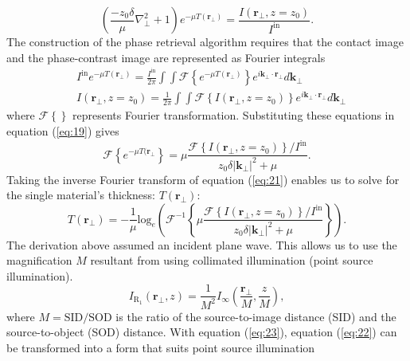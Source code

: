\documentclass[10pt, a4paper, singlespacing]{report}
\begin{document}
 \begin{equation}\label{eq:19}
\left (\frac{- z_0 \delta}{\mu}\nabla^{2}_{\perp} + 1 \right )e^{-\mu T(\mathbf{r}_{\perp})} = \frac{I(\mathbf{r}_{\perp}, z=z_0)}{I^{\mathrm{in}}}.
\end{equation}
The construction of the phase retrieval algorithm requires that the contact image and the phase-contrast image are represented as Fourier integrals\cite{Pags2002}
\begin{align}\label{eq:20}
&I^{\mathrm{in}} e^{-\mu T(\mathbf{r}_{\perp})} = \frac{I^{\mathrm{in}}}{2 \pi} \int \int \mathscr{F} \left \{ e^{-\mu T(\mathbf{r}_{\perp})} \right \} e^{i \mathbf{k}_{\perp}\cdot \mathbf{r}_{\perp}} d \mathbf{k}_{\perp}
\\&I(\mathbf{r}_{\perp}, z=z_0) = \frac{1}{2 \pi}  \int \int \mathscr{F} \left \{ I (\mathbf{r}_{\perp}, z = z_0) \right \} e^{i \mathbf{k}_{\perp}\cdot \mathbf{r}_{\perp}} d \mathbf{k}_{\perp}
\end{align}
where $\mathscr{F}\left \{ \right \}$ represents Fourier transformation. Substituting these equations in equation (\ref{eq:19}) gives
\begin{equation}\label{eq:21}
\mathscr{F}\left \{ e^{-\mu T(\mathbf{r}_{\perp}} \right \} = \mu \frac{\mathscr{F}\left \{ I(\mathbf{r}_{\perp}, z=z_0)\right \}/I^{\mathrm{in}}}{z_0 \delta |\mathbf{k}_{\perp}|^{2} + \mu}.
\end{equation}
Taking the inverse Fourier transform of equation (\ref{eq:21}) enables us to solve for the single material's thickness: $T(\mathbf{r}_{\perp})$:
\begin{equation}\label{eq:22}
T(\mathbf{r}_{\perp}) = - \frac{1}{\mu} \mathrm{log}_{e} \left ( \mathscr{F}^{-1} \left \{ \mu \frac{ \mathscr{F} \left \{I(\mathbf{r}_{\perp}, z=z_0) \right \} /  I^{\mathrm{in}}}{z_0 \delta |\mathbf{k}_{\perp}|^{2} + \mu}  \right \} \right ).
\end{equation}
The derivation above assumed an incident plane wave. This allows us to use the magnification $M$ resultant from using collimated illumination (point source illumination)\cite{Pags2002}.
\begin{equation}\label{eq:23}
I_{\mathrm{R_{1}}}(\mathbf{r_{\perp}}, z) = \frac{1}{M^2} I_{\infty} \left ( \frac{\mathbf{r_\perp}}{M}, \frac{z}{M} \right ),
\end{equation}
where $M = \mathrm{SID/SOD}$ is the ratio of the source-to-image distance (SID) and the source-to-object (SOD) distance. With equation (\ref{eq:23}), equation (\ref{eq:22}) can be transformed into a form that suits point source illumination\cite{Pags2002}
\end{document}
